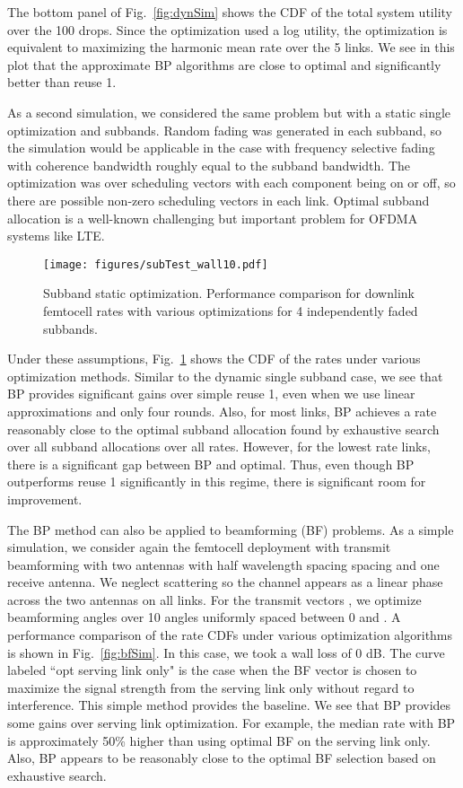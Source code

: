 \documentclass[letterpaper,twocolumn,twoside]{IEEEtran}
\begin{document}
The bottom panel of Fig.\ \ref{fig:dynSim} shows the CDF
of the total system utility over the 100 drops.  Since the optimization used
a log utility, the optimization is equivalent to maximizing the harmonic
mean rate over the 5 links.  We see in this plot that the approximate BP
algorithms are close to optimal and significantly better than reuse 1.


As a second simulation, we considered the same problem but with a
static single optimization and  subbands.  Random fading was
generated in each subband, so the simulation would be applicable
in the case with frequency selective fading with coherence bandwidth
roughly equal to the subband bandwidth.  The optimization was over
 scheduling vectors   with each component being on or off,
 so there are  possible non-zero scheduling vectors in each link.
Optimal subband allocation is a well-known
challenging but important problem for OFDMA systems like LTE.

\begin{figure}
\begin{center}
\texttt{[image: figures/subTest\_wall10.pdf]}
\end{center}
\caption{Subband static optimization.
Performance comparison for downlink femtocell rates with
various optimizations for 4 independently faded subbands.
}
\label{fig:subSim}
\end{figure}

Under these assumptions, Fig.\ \ref{fig:subSim} shows the CDF
of the rates under various optimization methods.
Similar to the dynamic single subband case, we see that BP
provides significant gains over simple reuse 1, even when we use
linear approximations and only four rounds.  Also, for most links,
BP achieves a rate reasonably close to the optimal subband allocation found by
exhaustive search over all subband allocations over all rates.
However, for the lowest rate links, there is a significant gap
between BP and optimal.  Thus, even though BP outperforms reuse 1
significantly in this regime, there is significant room for improvement.

The BP method can also be applied to beamforming (BF) problems.
As a simple simulation, we consider again the femtocell deployment
with transmit beamforming with two antennas with half wavelength spacing
spacing and one receive antenna.  We neglect scattering so the channel
appears as a linear phase across the two antennas on all links.
For the transmit vectors , we optimize beamforming angles
over 10 angles uniformly spaced between 0 and .
A performance comparison of the rate CDFs under various optimization
algorithms is shown in Fig.~\ref{fig:bfSim}.
In this case, we took a wall loss of 0 dB.
The curve labeled ``opt serving link only" is the case when the
BF vector is chosen to maximize the signal strength from the serving
link only without regard to interference.  This simple method provides
the baseline.  We see that BP provides some gains over serving link
optimization.  For example, the median rate with BP is approximately 50\%
higher than using optimal BF on the serving link only.
Also, BP appears to be reasonably close to the optimal BF selection
based on exhaustive search.
\end{document}
